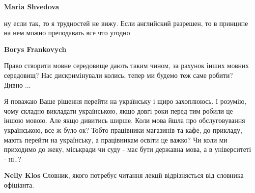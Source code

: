 \begin{itemize}
\begin{itemize}
 
\textbf{Maria Shvedova} 

ну если так, то я трудностей не вижу. Если английский разрешен, то в принципе
на нем можно преподавать все что угодно \Smiley[1.0][yellow]


 
\textbf{Borys Frankovych} 

Право створити мовне середовище дають таким чином, за рахунок інших мовних
середовищ? Нас дискримінували колись, тепер ми будемо теж саме робити? Дивно
...

\end{itemize}

 

Я поважаю Ваше рішення перейти на українську і щиро захоплююсь. І розумію, чому
складно викладати українською, якщо довгі роки перед тим робили це іншою мовою.
Але якщо дивитись ширше. Коли мова йшла про обслуговування українською, все ж
було ок? Тобто працівники магазинів та кафе, до прикладу, мають перейти на
українську, а працівникам освіти це важко? Чи коли ми приходимо до жеку,
міськради чи суду - має бути державна мова, а в університеті - ні..?

\begin{itemize}
 
\textbf{Nelly Klos} Словник, якого потребує читання лекції відрізняється від словника офіціанта.

 

\end{itemize}
\end{itemize}
